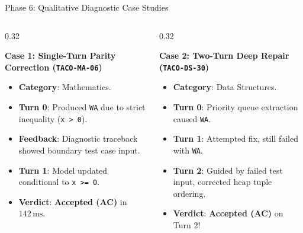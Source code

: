 \documentclass[aspectratio=169,10pt]{beamer}
\begin{document}
\begin{frame}{Phase 6: Qualitative Diagnostic Case Studies}
  \begin{columns}[T]
    \begin{column}{0.32\textwidth}
      \begin{block}{\textbf{Case 1: Single-Turn Parity Correction (\texttt{TACO-MA-06})}}
        \begin{itemize}\itemsep=2pt\tiny
          \item \textbf{Category}: Mathematics.
          \item \textbf{Turn 0}: Produced \texttt{WA} due to strict inequality (\texttt{x > 0}).
          \item \textbf{Feedback}: Diagnostic traceback showed boundary test case input.
          \item \textbf{Turn 1}: Model updated conditional to \texttt{x >= 0}.
          \item \textbf{Verdict}: \textbf{Accepted (AC)} in $142\,\text{ms}$.
        \end{itemize}
      \end{block}
    \end{column}

    \begin{column}{0.32\textwidth}
      \begin{exampleblock}{\textbf{Case 2: Two-Turn Deep Repair (\texttt{TACO-DS-30})}}
        \begin{itemize}\itemsep=2pt\tiny
          \item \textbf{Category}: Data Structures.
          \item \textbf{Turn 0}: Priority queue extraction caused \texttt{WA}.
          \item \textbf{Turn 1}: Attempted fix, still failed with \texttt{WA}.
          \item \textbf{Turn 2}: Guided by failed test input, corrected heap tuple ordering.
          \item \textbf{Verdict}: \textbf{Accepted (AC)} on Turn 2!
        \end{itemize}
      \end{exampleblock}
    \end{column}


\end{columns}
\end{frame}
\end{document}
